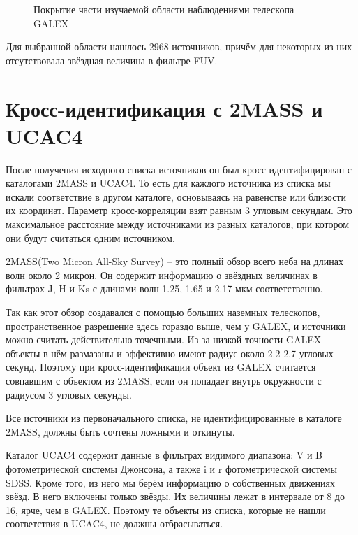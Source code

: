\begin{figure}[ht]
\hfill
\caption{Покрытие части изучаемой области наблюдениями телескопа GALEX}
\label{fig:cover}
\end{figure}

Для выбранной области нашлось 2968 источников, причём для некоторых из них отсутствовала звёздная величина в фильтре FUV. 


\section{Кросс-идентификация с 2MASS и UCAC4}
После получения исходного списка источников он был кросс-идентифицирован с каталогами 2MASS и UCAC4. То есть для каждого источника из списка мы искали соответствие в другом каталоге, основываясь на равенстве или близости их координат. Параметр кросс-корреляции взят равным 3 угловым секундам. Это максимальное расстояние между источниками из разных каталогов, при котором они будут считаться одним источником.

2MASS(Two Micron All-Sky Survey) -- это полный обзор всего неба на длинах волн около 2 микрон. Он содержит информацию о звёздных величинах в фильтрах J, H и Ks с длинами волн 1.25, 1.65 и 2.17 мкм соответственно.

Так как  этот обзор создавался с помощью больших наземных телескопов, пространственное разрешение здесь гораздо выше, чем у GALEX, и источники можно считать действительно точечными. Из-за низкой точности GALEX объекты в нём размазаны и эффективно имеют радиус около 2.2-2.7 угловых секунд. Поэтому при кросс-идентификации объект из GALEX считается совпавшим с объектом из 2MASS, если он попадает внутрь окружности с радиусом 3 угловых секунды.

Все источники из первоначального списка, не идентифицированные в каталоге 2MASS, должны быть сочтены ложными и откинуты.

Каталог UCAC4 содержит данные в фильтрах видимого диапазона: V и B фотометрической системы Джонсона, а также i и r фотометрической системы SDSS. Кроме того, из него мы берём информацию о собственных движениях звёзд. В него включены только звёзды. Их величины лежат в интервале от 8 до 16, ярче, чем в GALEX. Поэтому те объекты из списка, которые не нашли соответствия в UCAC4, не должны отбрасываться.

